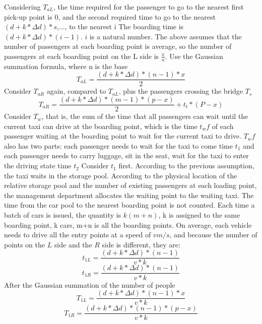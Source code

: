 Considering $T_{aL}$, the time required for the passenger to go to the nearest first pick-up point is 0, and the second required time to go to the nearest $(d+k*\Delta d)*s$,..., to the nearest i The boarding time is $(d+k*\Delta d)*(i-1)$. $i$ is a natural number. The above assumes that the number of passengers at each boarding point is average, so the number of passengers at each boarding point on the L side is $\frac{x}{n}$.
Use the Gaussian summation formula, where n is the base
\begin{equation} T_{aL} = \frac{{(d+k*\Delta d)}*{(n-1)}*{x}}{2}\end{equation}
Consider $T_{aR}$ again, compared to $T_{aL}$, plus the passengers crossing the bridge $T_s$
\begin{equation} T_{aR} = \frac{{(d+k*\Delta d)}*{(m-1)}*{(p-x)}}{2}+t_t*(P-x)\end{equation}
Consider $T_w$, that is, the sum of the time that all passengers can wait until the current taxi can drive at the boarding point, which is the time $t_wf$ of each passenger waiting at the boarding point to wait for the current taxi to drive.
$T_wf$ also has two parts: each passenger needs to wait for the taxi to come time $t_1$ and each passenger needs to carry luggage, sit in the seat, wait for the taxi to enter the driving state time $t_2$
Consider $t_1$ first. According to the previous assumption, the taxi waits in the storage pool. According to the physical location of the relative storage pool and the number of existing passengers at each loading point, the management department allocates the waiting point to the waiting taxi. The time from the car pool to the nearest boarding point is not counted. Each time a batch of cars is issued, the quantity is $k(m+n)$, k is assigned to the same boarding point, k cars, m+n is all the boarding points. On average, each vehicle needs to drive all the entry points at a speed of $vm/s$, and because the number of points on the $L$ side and the $R$ side is different, they are:
\begin{equation} t_{1L} = \frac{{(d+k*\Delta d)}*{(n-1)}}{v*k}\end{equation}
\begin{equation} t_{1R} = \frac{{(d+k*\Delta d)}*{(n-1)}}{v*k}\end{equation}
After the Gaussian summation of the number of people
\begin{equation} T_{1L} = \frac{{(d+k*\Delta d)}*{(n-1)}*x}{v*k}\end{equation}
\begin{equation} T_{1R} = \frac{{(d+k*\Delta d)}*{(n-1)}*(p-x)}{v*k}\end{equation}
